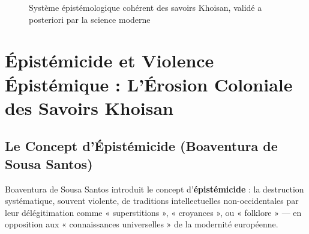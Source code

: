 \documentclass[12pt,a4paper]{report}
\begin{document}
\begin{figure}[ht]
\caption{Système épistémologique cohérent des savoirs Khoisan, validé a posteriori par la science moderne}
\label{fig:savoirs-khoisan}
\end{figure}

\section{Épistémicide et Violence Épistémique : L'Érosion Coloniale des Savoirs Khoisan}

\subsection{Le Concept d'Épistémicide (Boaventura de Sousa Santos)}

Boaventura de Sousa Santos \cite{Santos2014} introduit le concept d'\textbf{épistémicide} : la destruction systématique, souvent violente, de traditions intellectuelles non-occidentales par leur délégitimation comme « superstitions », « croyances », ou « folklore » — en opposition aux « connaissances universelles » de la modernité européenne.
\end{document}
